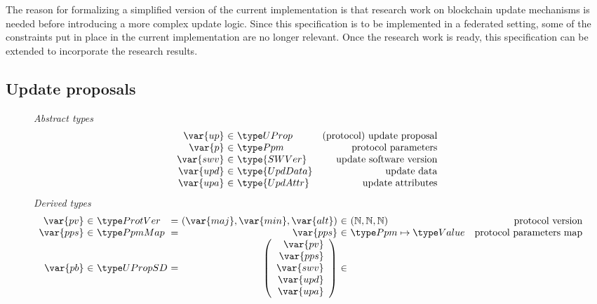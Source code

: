 The reason for formalizing a simplified version of the current implementation
is that research work on blockchain update mechanisms is needed before
introducing a more complex update logic. Since this specification is to be
implemented in a federated setting, some of the constraints put in place in the
current implementation are no longer relevant. Once the research work is ready,
this specification can be extended to incorporate the research results.

\subsection{Update proposals}
\label{sec:update-proposals}

\begin{figure}[htb]
  \emph{Abstract types}
  \begin{equation*}
    \begin{array}{r@{~\in~}lr}
      \var{up} & \UProp & \text{(protocol) update proposal}\\
      \var{p} & \ProtPm & \text{protocol parameters}\\
      \var{swv} & \type{SWVer} & \text{update software version}\\
      \var{upd} & \type{UpdData} & \text{update data}\\
      \var{upa} & \type{UpdAttr} & \text{update attributes}\\
    \end{array}
  \end{equation*}
  \emph{Derived types}
  \begin{equation*}
    \begin{array}{r@{~\in~}l@{~=~}r@{~\in~}lr}
      \var{pv} & \ProtVer & (\var{maj}, \var{min}, \var{alt})
      & (\mathbb{N}, \mathbb{N}, \mathbb{N}) & \text{protocol version}\\
      \var{pps} & \PPMMap & \var{pps} & \ProtPm \mapsto \Value
                                             & \text{protocol parameters map}\\
      \var{pb} & \UPropSD
      &
        {\left(\begin{array}{r l}
                 \var{pv}\\
                 \var{pps}\\
                 \var{swv}\\
                 \var{upd}\\
                 \var{upa}\\
               \end{array}\right)}

\end{array}
\end{equation*}
\end{figure}
